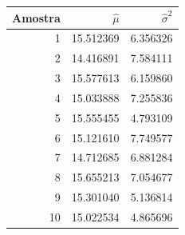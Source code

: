 \begin{tabular}{rrr}
\toprule
Amostra & $\hat{\mu}$ & $\hat{\sigma}^{2}$ \\
\midrule
1 & 15.512369 & 6.356326 \\
2 & 14.416891 & 7.584111 \\
3 & 15.577613 & 6.159860 \\
4 & 15.033888 & 7.255836 \\
5 & 15.555455 & 4.793109 \\
6 & 15.121610 & 7.749577 \\
7 & 14.712685 & 6.881284 \\
8 & 15.655213 & 7.054677 \\
9 & 15.301040 & 5.136814 \\
10 & 15.022534 & 4.865696 \\
\bottomrule
\end{tabular}
